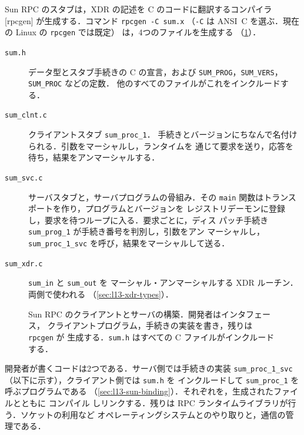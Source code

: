 \documentclass[../main.tex]{subfiles}
\begin{document}
Sun RPC のスタブは，XDR の記述を C のコードに翻訳するコンパイラ
[rpcgen] が生成する．コマンド \texttt{rpcgen -C sum.x}
（\texttt{-C} は ANSI~C を選ぶ．現在の Linux の \texttt{rpcgen} では既定）
は，4つのファイルを生成する
（\cref{fig:l13-rpcgen}）．
\begin{description}
  \item[\texttt{sum.h}] データ型とスタブ手続きの C の宣言，および
    \texttt{SUM\_PROG}，\texttt{SUM\_VERS}，\texttt{SUM\_PROC} などの定数．
    他のすべてのファイルがこれをインクルードする．
  \item[\texttt{sum\_clnt.c}] クライアントスタブ \texttt{sum\_proc\_1}．
    手続きとバージョンにちなんで名付けられる．引数をマーシャルし，ランタイムを
    通じて要求を送り，応答を待ち，結果をアンマーシャルする．
  \item[\texttt{sum\_svc.c}] サーバスタブと，サーバプログラムの骨組み．その
    \texttt{main} 関数はトランスポートを作り，プログラムとバージョンを
    レジストリデーモンに登録し，要求を待つループに入る．要求ごとに，ディス
    パッチ手続き \texttt{sum\_prog\_1} が手続き番号を判別し，引数をアン
    マーシャルし，\texttt{sum\_proc\_1\_svc} を呼び，結果をマーシャルして送る．
  \item[\texttt{sum\_xdr.c}] \texttt{sum\_in} と \texttt{sum\_out} を
    マーシャル・アンマーシャルする XDR ルーチン．両側で使われる
    （\cref{sec:l13-xdr-types}）．
\end{description}

\begin{figure}[htbp]
  \centering
  
  \caption{Sun RPC のクライアントとサーバの構築．開発者はインタフェース，
    クライアントプログラム，手続きの実装を書き，残りは \texttt{rpcgen} が
    生成する．\texttt{sum.h} はすべての C ファイルがインクルードする．}
  \label{fig:l13-rpcgen}
\end{figure}

開発者が書くコードは2つである．サーバ側では手続きの実装
\texttt{sum\_proc\_1\_svc}（以下に示す），クライアント側では \texttt{sum.h} を
インクルードして \texttt{sum\_proc\_1} を呼ぶプログラムである
（\cref{sec:l13-sun-binding}）．それぞれを，生成されたファイルとともに
コンパイル
しリンクする．残りは RPC ランタイムライブラリが行う．ソケットの利用など
オペレーティングシステムとのやり取りと，通信の管理である．
\end{document}
